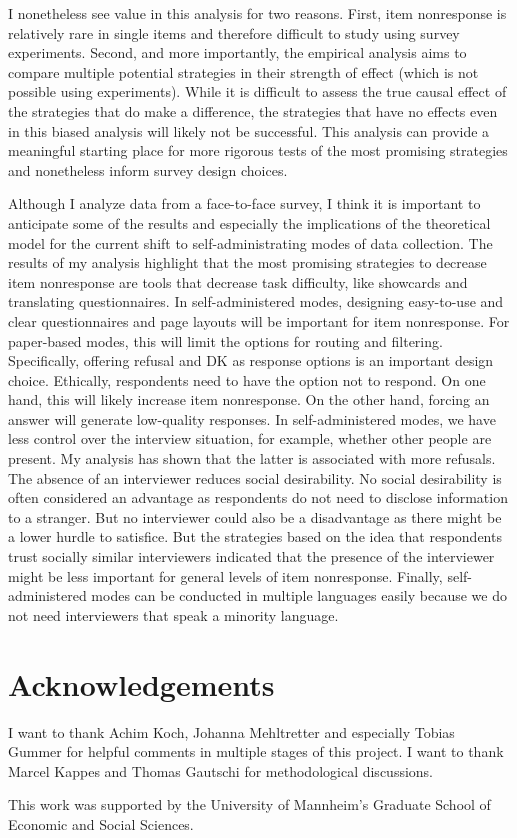 \documentclass[a4paper,12pt]{article}
\begin{document}
I nonetheless see value in this analysis for two reasons. First, item nonresponse is relatively rare in single items and therefore difficult to study using survey experiments. Second, and more importantly, the empirical analysis aims to compare multiple potential strategies in their strength of effect (which is not possible using experiments). While it is difficult to assess the true causal effect of the strategies that do make a difference, the strategies that have no effects even in this biased analysis will likely not be successful. This analysis can provide a meaningful starting place for more rigorous tests of the most promising strategies and nonetheless inform survey design choices.

Although I analyze data from a face-to-face survey, I think it is important to anticipate some of the results and especially the implications of the theoretical model for the current shift to self-administrating modes of data collection. The results of my analysis highlight that the most promising strategies to decrease item nonresponse are tools that decrease task difficulty, like showcards and translating questionnaires. In self-administered modes, designing easy-to-use and clear questionnaires and page layouts will be important for item nonresponse. For paper-based modes, this will limit the options for routing and filtering. Specifically, offering refusal and DK as response options is an important design choice. Ethically, respondents need to have the option not to respond. On one hand, this will likely increase item nonresponse. On the other hand, forcing an answer will generate low-quality responses. In self-administered modes, we have less control over the interview situation, for example, whether other people are present. My analysis has shown that the latter is associated with more refusals. The absence of an interviewer reduces social desirability. No social desirability is often considered an advantage as respondents do not need to disclose information to a stranger. But no interviewer could also be a disadvantage as there might be a lower hurdle to satisfice. But the strategies based on the idea that respondents trust socially similar interviewers indicated that the presence of the interviewer might be less important for general levels of item nonresponse. Finally, self-administered modes can be conducted in multiple languages easily because we do not need interviewers that speak a minority language.


\section*{Acknowledgements}

I want to thank Achim Koch, Johanna Mehltretter and especially Tobias Gummer for helpful comments in multiple stages of this project. I want to thank Marcel Kappes and Thomas Gautschi for methodological discussions.

This work was supported by the University of Mannheim’s Graduate School of Economic and Social Sciences.

\singlespacing
\printbibliography
\end{document}
